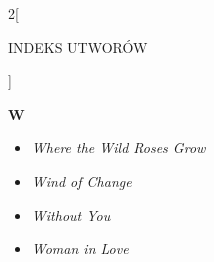\documentclass[a4paper]{report}
\begin{document}
\begin{multicols*}{2}[\begin{Huge}INDEKS UTWORÓW\end{Huge}\vspace{1cm}]
\begin{minipage}{\columnwidth}
\begin{itemize}[topsep=6pt, after=\vspace{5mm}, leftmargin=0mm]
	\end{itemize}
\end{minipage}
\begin{minipage}{\columnwidth}
\begin{Large}
		\textbf{W}
	\end{Large} 
	\begin{itemize}[topsep=6pt, after=\vspace{1.5mm}, leftmargin=0mm]
		\itemsep0em
		\item[]\textit{Where the Wild Roses Grow}  \\
		\item[]  \textit{Wind of Change}  \\
	\end{itemize}
\end{minipage}
\begin{minipage}{\columnwidth}
	\begin{itemize}[topsep=6pt, after=\vspace{5mm}, leftmargin=0mm]
		\itemsep0em
		\item[]  \textit{Without You}  \\
		\item[]  \textit{Woman in Love}  \\
	\end{itemize}
\end{minipage}



\end{multicols*}
\end{document}
